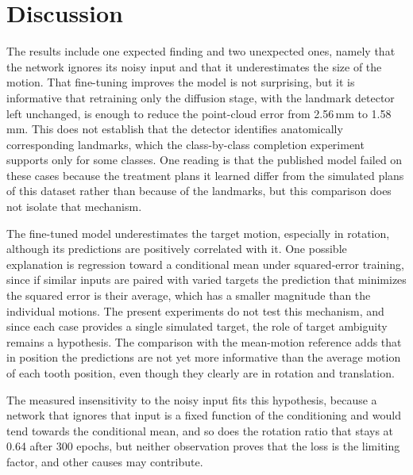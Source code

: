 \documentclass[10pt,a4paper]{article}
\begin{document}
\section{Discussion}

The results include one expected finding and two unexpected ones, namely that the network ignores its noisy input and that it underestimates the size of the motion. That fine-tuning improves the model is not surprising, but it is informative that retraining only the diffusion stage, with the landmark detector left unchanged, is enough to reduce the point-cloud error from 2.56\,mm to 1.58\,mm. This does not establish that the detector identifies anatomically corresponding landmarks, which the class-by-class completion experiment supports only for some classes. One reading is that the published model failed on these cases because the treatment plans it learned differ from the simulated plans of this dataset rather than because of the landmarks, but this comparison does not isolate that mechanism.

The fine-tuned model underestimates the target motion, especially in rotation, although its predictions are positively correlated with it. One possible explanation is regression toward a conditional mean under squared-error training, since if similar inputs are paired with varied targets the prediction that minimizes the squared error is their average, which has a smaller magnitude than the individual motions. The present experiments do not test this mechanism, and since each case provides a single simulated target, the role of target ambiguity remains a hypothesis. The comparison with the mean-motion reference adds that in position the predictions are not yet more informative than the average motion of each tooth position, even though they clearly are in rotation and translation.


The measured insensitivity to the noisy input fits this hypothesis, because a network that ignores that input is a fixed function of the conditioning and would tend towards the conditional mean, and so does the rotation ratio that stays at 0.64 after 300 epochs, but neither observation proves that the loss is the limiting factor, and other causes may contribute.
\end{document}
